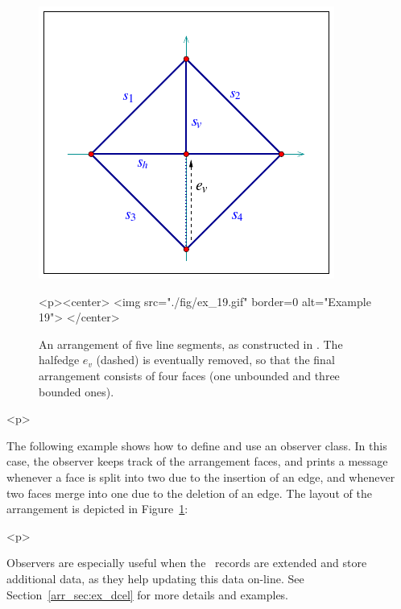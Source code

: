 \begin{figure}[!htp]
\begin{ccTexOnly}
  \begin{center}
  \includegraphics{Arrangement_2/fig/ex_19}
  \end{center}
\end{ccTexOnly}
\begin{ccHtmlOnly}
  <p><center>
  <img src="./fig/ex_19.gif" border=0 alt="Example 19">
  </center>
\end{ccHtmlOnly}
\caption{An arrangement of five line segments, as constructed in
. The halfedge $e_v$ (dashed) is eventually
removed, so that the final arrangement consists of four faces (one
unbounded and three bounded ones).}
\label{arr_fig:ex_19}
\end{figure}

\begin{ccHtmlOnly}<p>\end{ccHtmlOnly}
The following example shows how to define and use an observer
class. In this case, the observer keeps track of the arrangement
faces, and prints a message whenever a face is split into two due
to the insertion of an edge, and whenever two faces merge into one
due to the deletion of an edge. The layout of the arrangement is
depicted in Figure~\ref{arr_fig:ex_19}:


\begin{ccHtmlOnly}<p>\end{ccHtmlOnly}
Observers are especially useful when the \dcel\ records are
extended and store additional data, as they help updating this
data on-line. See Section~\ref{arr_sec:ex_dcel} for more details
and examples.

